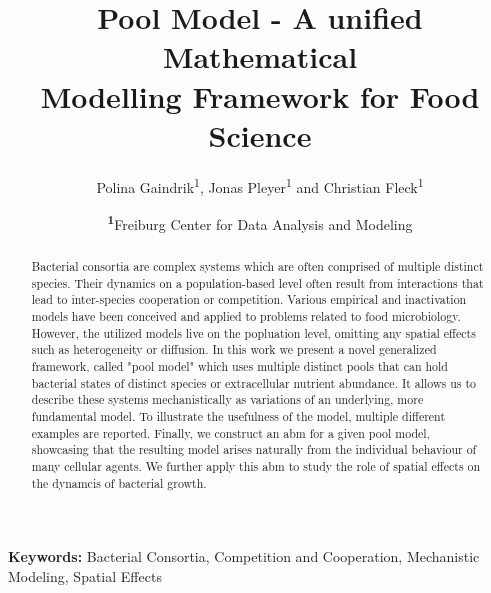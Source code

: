 \documentclass[10pt,A4paper]{article}
\title{Pool Model - A unified Mathematical\\ Modelling Framework for Food Science}
\author{
    Polina Gaindrik\textsuperscript{1},
    Jonas Pleyer\textsuperscript{1}
    and Christian Fleck\textsuperscript{1}
}
\date{
    \footnotesize
    \textsuperscript{\textbf{1}}Freiburg Center for Data Analysis and Modeling
}
\numberwithin{equation}{section}
\begin{document}
\maketitle

\begin{abstract}
    Bacterial consortia are complex systems which are often comprised of multiple distinct species.
    Their dynamics on a population-based level often result from interactions that lead to
    inter-species cooperation or competition.
    Various empirical and inactivation models have been conceived and applied to problems related to
    food microbiology.
    However, the utilized models live on the popluation level, omitting any spatial effects such as
    heterogeneity or diffusion.
    In this work we present a novel generalized framework, called "pool model" which uses multiple
    distinct pools that can hold bacterial states of distinct species or extracellular nutrient
    abundance.
    It allows us to describe these systems mechanistically as variations of an underlying, more
    fundamental model.
    To illustrate the usefulness of the model, multiple different examples are reported.
    Finally, we construct an \acl{abm} for a given pool model, showcasing that the resulting model
    arises naturally from the individual behaviour of many cellular agents.
    We further apply this \ac{abm} to study the role of spatial effects on the dynamcis of bacterial
    growth.
\end{abstract}

\textbf{Keywords:}
Bacterial Consortia, Competition and Cooperation, Mechanistic Modeling, Spatial Effects

\newpage
\tableofcontents
\end{document}
